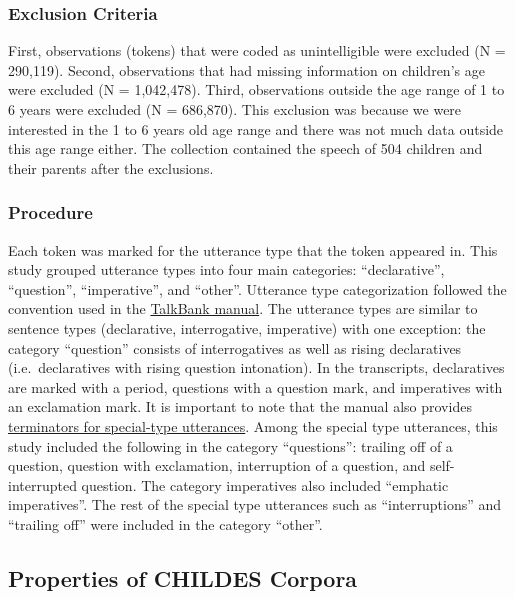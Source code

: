 \documentclass[floatsintext,man]{apa6}
\theoremstyle{definition}
\theoremstyle{definition}
\theoremstyle{definition}
\theoremstyle{remark}
\begin{document}
\subsubsection{Exclusion Criteria}\label{exclusion-criteria}

First, observations (tokens) that were coded as unintelligible were
excluded (N = 290,119). Second, observations that had missing
information on children's age were excluded (N = 1,042,478). Third,
observations outside the age range of 1 to 6 years were excluded (N =
686,870). This exclusion was because we were interested in the 1 to 6
years old age range and there was not much data outside this age range
either. The collection contained the speech of 504 children and their
parents after the exclusions.

\subsubsection{Procedure}\label{procedure}

Each token was marked for the utterance type that the token appeared in.
This study grouped utterance types into four main categories:
\enquote{declarative}, \enquote{question}, \enquote{imperative}, and
\enquote{other}. Utterance type categorization followed the convention
used in the
\href{https://talkbank.org/manuals/CHAT.html\#_Toc486414422}{TalkBank
manual}. The utterance types are similar to sentence types (declarative,
interrogative, imperative) with one exception: the category
\enquote{question} consists of interrogatives as well as rising
declaratives (i.e.~declaratives with rising question intonation). In the
transcripts, declaratives are marked with a period, questions with a
question mark, and imperatives with an exclamation mark. It is important
to note that the manual also provides
\href{https://talkbank.org/manuals/CHAT.html\#_Toc486414431}{terminators
for special-type utterances}. Among the special type utterances, this
study included the following in the category \enquote{questions}:
trailing off of a question, question with exclamation, interruption of a
question, and self-interrupted question. The category imperatives also
included \enquote{emphatic imperatives}. The rest of the special type
utterances such as \enquote{interruptions} and \enquote{trailing off}
were included in the category \enquote{other}.\\

\subsection{Properties of CHILDES
Corpora}\label{properties-of-childes-corpora}
\end{document}
